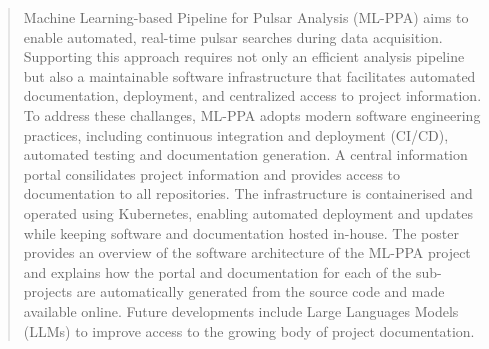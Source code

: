 \documentclass[11pt,twoside]{article}
\begin{document}
\begin{abstract}
Machine Learning-based Pipeline for Pulsar Analysis (ML-PPA) aims to enable automated, real-time pulsar searches during data acquisition. Supporting this approach requires not only an efficient analysis pipeline but also a maintainable software infrastructure that facilitates automated documentation, deployment, and centralized access to project information.
To address these challanges, ML-PPA adopts modern software engineering practices, including continuous integration and deployment (CI/CD), automated testing and documentation generation. A central information portal consilidates project information and provides access to documentation to all repositories. The infrastructure is containerised and operated using Kubernetes, enabling automated deployment and updates while keeping software and documentation hosted in-house. The poster provides an overview of the software architecture of the ML-PPA project and explains how the portal and documentation for each of the sub-projects are automatically generated from the source code and made available online. Future developments include Large Languages Models (LLMs) to improve access to the growing body of project documentation.


\end{abstract}


    

\end{document}
